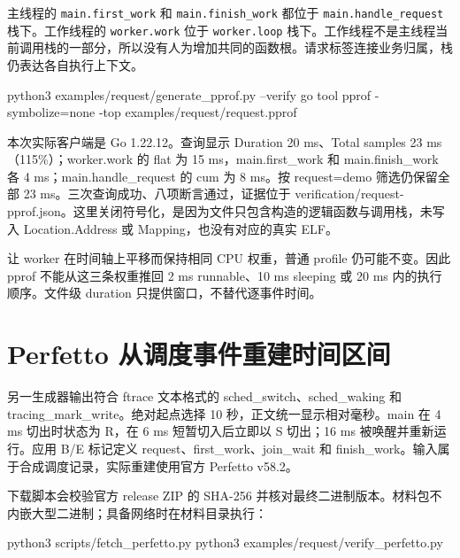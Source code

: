 \documentclass[UTF8,fontset=fandol,openany,11pt]{ctexbook}
\begin{document}
主线程的 \texttt{main.\allowbreak{}first\_\allowbreak{}work} 和 \texttt{main.\allowbreak{}finish\_\allowbreak{}work} 都位于 \texttt{main.\allowbreak{}handle\_\allowbreak{}request} 栈下。工作线程的 \texttt{worker.\allowbreak{}work} 位于 \texttt{worker.\allowbreak{}loop} 栈下。工作线程不是主线程当前调用栈的一部分，所以没有人为增加共同的函数根。请求标签连接业务归属，栈仍表达各自执行上下文。



\begin{codeblock}
python3 examples/request/generate_pprof.py --verify
go tool pprof -symbolize=none -top examples/request/request.pprof
\end{codeblock}

本次实际客户端是 Go 1.22.12。查询显示 Duration 20 ms、Total samples 23 ms（115\%）；worker.work 的 flat 为 15 ms，main.first\_\allowbreak{}work 和 main.finish\_\allowbreak{}work 各 4 ms；main.handle\_\allowbreak{}request 的 cum 为 8 ms。按 request=demo 筛选仍保留全部 23 ms。三次查询成功、八项断言通过，证据位于 verification/request-pprof.json。这里关闭符号化，是因为文件只包含构造的逻辑函数与调用栈，未写入 Location.Address 或 Mapping，也没有对应的真实 ELF。


让 worker 在时间轴上平移而保持相同 CPU 权重，普通 profile 仍可能不变。因此 pprof 不能从这三条权重推回 2 ms runnable、10 ms sleeping 或 20 ms 内的执行顺序。文件级 duration 只提供窗口，不替代逐事件时间。


\section{Perfetto 从调度事件重建时间区间}

另一生成器输出符合 ftrace 文本格式的 sched\_\allowbreak{}switch、sched\_\allowbreak{}waking 和 tracing\_\allowbreak{}mark\_\allowbreak{}write。绝对起点选择 10 秒，正文统一显示相对毫秒。main 在 4 ms 切出时状态为 R，在 6 ms 短暂切入后立即以 S 切出；16 ms 被唤醒并重新运行。应用 B/E 标记定义 request、first\_\allowbreak{}work、join\_\allowbreak{}wait 和 finish\_\allowbreak{}work。输入属于合成调度记录，实际重建使用官方 Perfetto v58.2。\cite{pf-request}


下载脚本会校验官方 release ZIP 的 SHA-256 并核对最终二进制版本。材料包不内嵌大型二进制；具备网络时在材料目录执行：



\begin{codeblock}
python3 scripts/fetch_perfetto.py
python3 examples/request/verify_perfetto.py
\end{codeblock}
\end{document}
